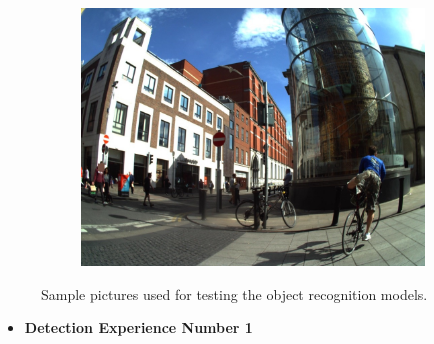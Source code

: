 \begin{figure}[H]
\begin{subfigure}{0.3\textwidth}
  \includegraphics[width=\textwidth]{Sections/4InitialWork/4_images_obj_run4/photo.jpg}
  \end{subfigure}

  \caption[Sample pictures used for testing]{Sample pictures used for testing the object recognition models.}
  \end{figure}


\newpage
    
  \begin{itemize}
    \item \textbf{Detection Experience Number 1}
  \end{itemize}

    

